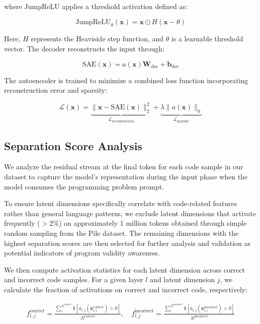 where JumpReLU applies a threshold activation defined as:

\begin{equation}
    \text{JumpReLU}_\theta(\mathbf{x}) = \mathbf{x} \odot H(\mathbf{x} - \theta)
\end{equation}

Here, $H$ represents the Heaviside step function, and $\theta$ is a learnable threshold vector. The decoder reconstructs the input through:

\begin{equation}
    \text{SAE}(\mathbf{x})=a(\mathbf{x})\mathbf{W}_{\text{dec}}+\mathbf{b}_{\text{dec}}
\end{equation}

The autoencoder is trained to minimize a combined loss function incorporating reconstruction error and sparsity:

\begin{equation}
    \mathcal{L}(\mathbf{x}) = \underbrace{\|\mathbf{x} - \text{SAE}(\mathbf{x})\|_2^2}_{\mathcal{L}_{\text{reconstruction}}} + \underbrace{\lambda \|a(\mathbf{x})\|_0}_{\mathcal{L}_{\text{sparsity}}}
\end{equation}

\subsection{Separation Score Analysis}

We analyze the residual stream at the final token for each code sample in our dataset to capture the model's representation during the input phase when the model consumes the programming problem prompt. 

To ensure latent dimensions specifically correlate with code-related features rather than general language patterns, we exclude latent dimensions that activate frequently ($>2\%$) on approximately 1 million tokens obtained through simple random sampling from the Pile dataset. The remaining dimensions with the highest separation scores are then selected for further analysis and validation as potential indicators of program validity awareness.

We then compute activation statistics for each latent dimension across correct and incorrect code samples. For a given layer $l$ and latent dimension $j$, we calculate the fraction of activations on correct and incorrect code, respectively:

\begin{align}
    f_{l,j}^{\text{correct}} = \frac{\sum_{i}^{N^{\text{correct}}} \mathbf{1}[a_{l,j}(\mathbf{x}_{l,i}^{\text{correct}}) > 0]}{N^{\text{correct}}}, \quad   
    f_{l,j}^{\text{incorrect}} = \frac{\sum_{i}^{N^{\text{incorrect}}} \mathbf{1} [a_{l,j}(\mathbf{x}_{l,i}^{\text{incorrect}}) > 0]}{N^{\text{incorrect}}}
\end{align}

